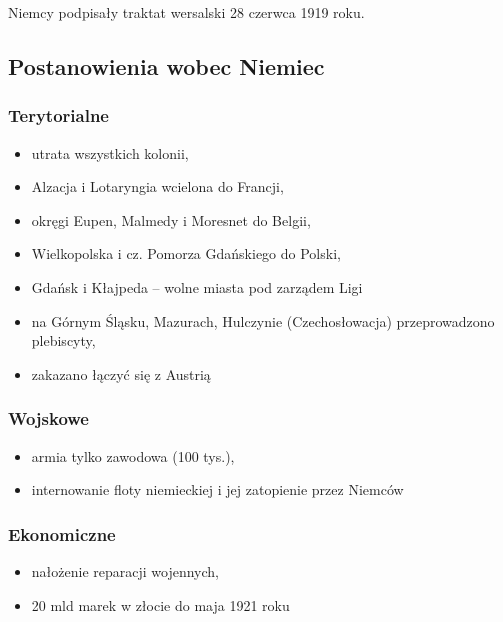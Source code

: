 \documentclass [a4paper, 11pt, oneside]{book}
\begin{document}
        Niemcy podpisały traktat wersalski 28 czerwca 1919 roku.
        \subsection{Postanowienia wobec Niemiec} %
        \label{sub:postanowienia_wobec_niemiec}
            \subsubsection{Terytorialne} %
            \label{ssub:terytorialne}
                \begin{itemize}
                    \item utrata wszystkich kolonii,
                    \item Alzacja i Lotaryngia wcielona do Francji,
                    \item okręgi Eupen, Malmedy i Moresnet do Belgii,
                    \item Wielkopolska i cz. Pomorza Gdańskiego do Polski,
                    \item Gdańsk i Kłajpeda -- wolne miasta pod zarządem Ligi
                    \item na Górnym Śląsku, Mazurach, Hulczynie (Czechosłowacja) przeprowadzono plebiscyty,
                    \item zakazano łączyć się z Austrią
                \end{itemize}
            \subsubsection{Wojskowe} %
            \label{ssub:wojskowe}
                \begin{itemize}
                    \item armia tylko zawodowa (100 tys.),
                    \item internowanie floty niemieckiej i jej zatopienie przez Niemców
                \end{itemize}
            \subsubsection{Ekonomiczne} %
            \label{ssub:ekonomiczne}
                \begin{itemize}
                    \item nałożenie reparacji wojennych,
                    \item 20 mld marek w złocie do maja 1921 roku
                \end{itemize}
\end{document}
